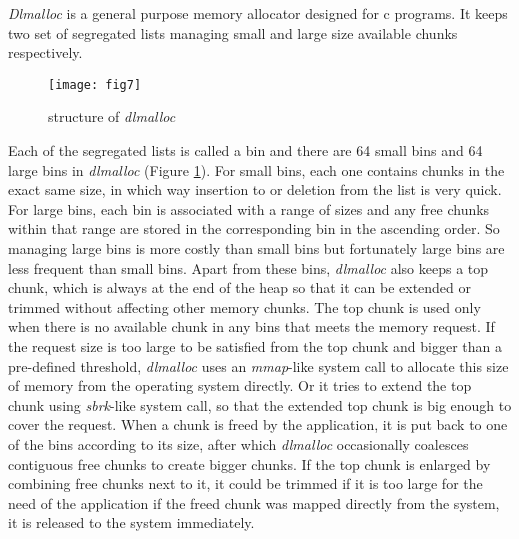 \emph{Dlmalloc} is a general purpose memory allocator designed for c programs. It keeps two set of segregated lists managing small and large size available chunks respectively. 
\begin{figure}[htbp]
\centering
\texttt{[image: fig7]}
\caption{structure of \emph{dlmalloc}}\label{fig_7}
\end{figure}
Each of the segregated lists is called a bin and there are 64 small bins and 64 large bins in \emph{dlmalloc} (Figure \ref{fig_7}). For small bins, each one contains chunks in the exact same size, in which way insertion to or deletion from the list is very quick. For large bins, each bin is associated with a range of sizes and any free chunks within that range are stored in the corresponding bin in the ascending order. So managing large bins is more costly than small bins but fortunately large bins are less frequent than small bins. Apart from these bins, \emph{dlmalloc} also keeps a top chunk, which is always at the end of the heap so that it can be extended or trimmed without affecting other memory chunks. The top chunk is used only when there is no available chunk in any bins that meets the memory request. If the request size is too large to be satisfied from the top chunk and bigger than a pre-defined threshold, \emph{dlmalloc} uses an \emph{mmap}-like system call to allocate this size of memory from the operating system directly. Or it tries to extend the top chunk using \emph{sbrk}-like system call, so that the extended top chunk is big enough to cover the request.
When a chunk is freed by the application, it is put back to one of the bins according to its size, after which \emph{dlmalloc} occasionally coalesces contiguous free chunks to create bigger chunks. If the top chunk is enlarged by combining free chunks next to it, it could be trimmed if it is too large for the need of the application if the freed chunk was mapped directly from the system, it is released to the system immediately. 

